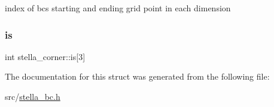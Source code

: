 index of bc\textquotesingle{}s starting and ending grid point in each dimension 

\mbox{\label{structstella__corner_a9738df74b92326d08e4cd90973bd127e}} 
\subsubsection{\texorpdfstring{is}{is}}
{\footnotesize\ttfamily int stella\+\_\+corner\+::is\mbox{[}3\mbox{]}}



The documentation for this struct was generated from the following file\+:\begin{DoxyCompactItemize}
\item 
src/\mbox{\hyperlink{stella__bc_8h}{stella\+\_\+bc.\+h}}\end{DoxyCompactItemize}
